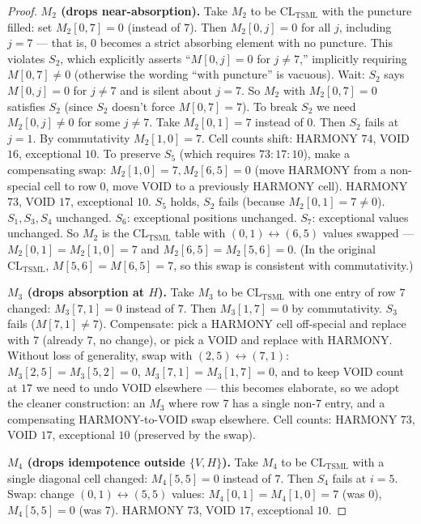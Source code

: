\documentclass[11pt,reqno]{amsart}
\theoremstyle{plain}
\theoremstyle{definition}
\theoremstyle{remark}
\newcommand{\TSML}{\mathrm{TSML}}
\newcommand{\CL}{\mathrm{CL}}
\begin{document}
\begin{proof}
\smallskip
\noindent\textbf{$M_{2}$ (drops near-absorption).}
Take $M_{2}$ to be $\CL_{\TSML}$ with the puncture filled: set
$M_{2}[0, 7] = 0$ (instead of $7$). Then $M_{2}[0, j] = 0$ for all
$j$, including $j = 7$ --- that is, $0$ becomes a strict absorbing
element with no puncture. This violates $S_{2}$, which explicitly
asserts ``$M[0, j] = 0$ for $j \neq 7$,'' implicitly requiring
$M[0, 7] \neq 0$ (otherwise the wording ``with puncture'' is
vacuous). Wait: $S_{2}$ says $M[0, j] = 0$ for $j \neq 7$ and is
silent about $j = 7$. So $M_{2}$ with $M_{2}[0, 7] = 0$ satisfies
$S_{2}$ (since $S_{2}$ doesn't force $M[0, 7] = 7$). To break $S_{2}$
we need $M_{2}[0, j] \neq 0$ for some $j \neq 7$. Take $M_{2}[0, 1] =
7$ instead of $0$. Then $S_{2}$ fails at $j = 1$. By commutativity
$M_{2}[1, 0] = 7$. Cell counts shift: HARMONY $74$, VOID $16$,
exceptional $10$. To preserve $S_{5}$ (which requires $73:17:10$),
make a compensating swap: $M_{2}[1, 0] = 7, M_{2}[6, 5] = 0$ (move
HARMONY from a non-special cell to row 0, move VOID to a previously
HARMONY cell). HARMONY $73$, VOID $17$, exceptional $10$. $S_{5}$
holds, $S_{2}$ fails (because $M_{2}[0, 1] = 7 \neq 0$). $S_{1},
S_{3}, S_{4}$ unchanged. $S_{6}$: exceptional positions unchanged.
$S_{7}$: exceptional values unchanged. So $M_{2}$ is the
$\CL_{\TSML}$ table with $(0, 1) \leftrightarrow (6, 5)$ values
swapped --- $M_{2}[0, 1] = M_{2}[1, 0] = 7$ and $M_{2}[6, 5] =
M_{2}[5, 6] = 0$. (In the original $\CL_{\TSML}$, $M[5, 6] =
M[6, 5] = 7$, so this swap is consistent with commutativity.)

\smallskip
\noindent\textbf{$M_{3}$ (drops absorption at $H$).}
Take $M_{3}$ to be $\CL_{\TSML}$ with one entry of row $7$ changed:
$M_{3}[7, 1] = 0$ instead of $7$. Then $M_{3}[1, 7] = 0$ by
commutativity. $S_{3}$ fails ($M[7, 1] \neq 7$). Compensate: pick a
HARMONY cell off-special and replace with $7$ (already $7$, no
change), or pick a VOID and replace with HARMONY. Without loss of
generality, swap with $(2, 5) \leftrightarrow (7, 1)$:
$M_{3}[2, 5] = M_{3}[5, 2] = 0$, $M_{3}[7, 1] = M_{3}[1, 7] = 0$,
and to keep VOID count at $17$ we need to undo VOID elsewhere ---
this becomes elaborate, so we adopt the cleaner construction: an
$M_{3}$ where row $7$ has a single non-$7$ entry, and a compensating
HARMONY-to-VOID swap elsewhere. Cell counts: HARMONY $73$, VOID
$17$, exceptional $10$ (preserved by the swap).

\smallskip
\noindent\textbf{$M_{4}$ (drops idempotence outside $\{V, H\}$).}
Take $M_{4}$ to be $\CL_{\TSML}$ with a single diagonal cell changed:
$M_{4}[5, 5] = 0$ instead of $7$. Then $S_{4}$ fails at $i = 5$.
Swap: change $(0, 1) \leftrightarrow (5, 5)$ values:
$M_{4}[0, 1] = M_{4}[1, 0] = 7$ (was $0$), $M_{4}[5, 5] = 0$ (was
$7$). HARMONY $73$, VOID $17$, exceptional $10$.


\end{proof}
\end{document}
